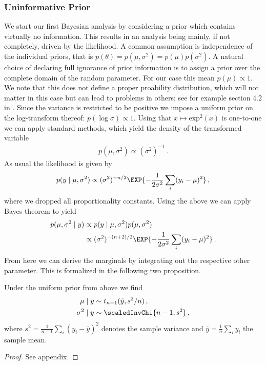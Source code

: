 \subsubsection*{Uninformative Prior}
We start our first Bayesian analysis by considering a prior which contains virtually no information.
This results in an analysis being mainly, if not completely, driven by the likelihood.
A common assumption is independence of the individual priors, that is $p(\theta) = p(\mu, \sigma^2) = p(\mu) p(\sigma^2)$.
A natural choice of declaring full ignorance of prior information is to assign a prior over the complete domain of the random parameter. For our case this mean $p(\mu) \propto 1$.
We note that this does not define a proper proability distribution, which will not matter in this case but can lead to problems in others; see for example section 4.2 in \citet{kass1996}.
Since the variance is restricted to be positive we impose a uniform prior on the log-transform thereof: $p(\log \sigma) \propto 1$.
Using that $x \mapsto \text{exp}^2(x)$ is one-to-one we can apply standard methods, which yield the density of the transformed variable
\begin{align}
  p(\mu, \sigma^2) \propto (\sigma^2)^{-1} \,.
\end{align}
As usual the likelihood is given by
\begin{align}
  p(y \mid \mu, \sigma^2) \propto (\sigma^2)^{-n/2} \EXP{-\frac{1}{2\sigma^2}\sum_i (y_i - \mu)^2} \,,
\end{align}
where we dropped all proportionality constants.
Using the above we can apply Bayes theorem to yield
\begin{align}
  p(\mu, \sigma^2 \mid y) &\propto p(y \mid \mu, \sigma^2) p(\mu, \sigma^2)\\
  &\propto (\sigma^2)^{-(n+2)/2} \EXP{-\frac{1}{2\sigma^2}\sum_i (y_i - \mu)^2} \,.
\end{align}
From here we can derive the marginals by integrating out the respective other parameter. This is formalized in the following two proposition.

\begin{proposition}\label{prop:posterior_uniform}
  Under the uniform prior from above we find
  \begin{align}
    \mu \mid y &\sim t_{n-1}(\bar{y}, s^2/n) \,,\\
    \sigma^2 \mid y &\sim \scaledInvChi{n-1, s^2} \,,
  \end{align}
  where $s^2 = \frac{1}{n-1} \sum_i (y_i - \bar{y})^2$ denotes the sample variance and $\bar{y} = \frac{1}{n} \sum_i y_i$ the sample mean.
\end{proposition}
\begin{proof}
See appendix.
\end{proof}

